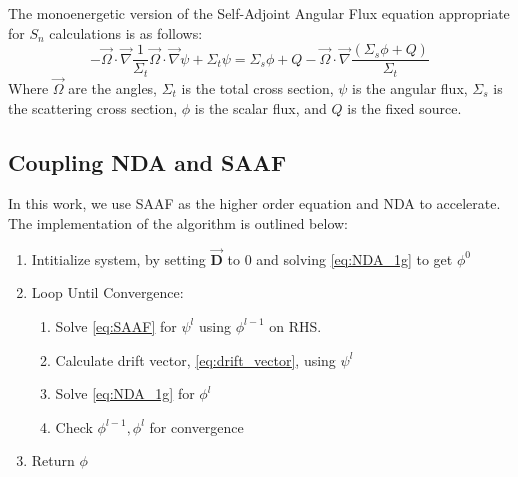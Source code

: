 The monoenergetic version of the Self-Adjoint Angular Flux equation appropriate for $S_n$ calculations is as follows:
\begin{equation}
    - \vec{\Omega} \cdot \vec{\nabla}\frac{1}{\Sigma_t}\vec{\Omega} \cdot \vec{\nabla} \psi + \Sigma_t \psi = \Sigma_s\phi + Q - \vec{\Omega} \cdot \vec{\nabla} \frac{(\Sigma_s\phi + Q)}{\Sigma_t}
    \label{eq:SAAF}
\end{equation}
Where $\vec{\Omega}$ are the angles, $\Sigma_t$ is the total cross section, $\psi$ is the angular flux, $\Sigma_s$ is the scattering cross section, $\phi$ is the scalar flux, and $Q$ is the fixed source.

\subsection{Coupling NDA and SAAF}
In this work, we use SAAF as the higher order equation and NDA to accelerate. The implementation of the algorithm is outlined below:

\begin{enumerate}
    \item Intitialize system, by setting $\vec{\textbf{D}}$ to 0 and solving \eqref{eq:NDA_1g} to get $\phi^0$ 
    \item Loop Until Convergence:
        \begin{enumerate}
            \item Solve \eqref{eq:SAAF} for $\psi^l$ using $\phi^{l-1}$ on RHS.
            \item Calculate drift vector, \eqref{eq:drift_vector}, using $\psi^l$
            \item Solve \eqref{eq:NDA_1g} for $\phi^l$
            \item Check $\phi^{l-1}, \phi^l$ for convergence
        \end{enumerate}
    \item Return $\phi$
\end{enumerate}





